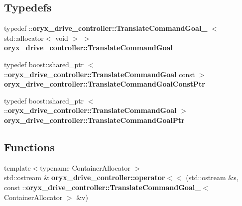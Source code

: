 \subsection*{\-Typedefs}
\begin{DoxyCompactItemize}
\item 
typedef \*
\-::{\bf oryx\-\_\-drive\-\_\-controller\-::\-Translate\-Command\-Goal\-\_\-}\*
$<$ std\-::allocator$<$ void $>$ $>$ {\bf oryx\-\_\-drive\-\_\-controller\-::\-Translate\-Command\-Goal}
\item 
typedef boost\-::shared\-\_\-ptr\*
$<$ \-::{\bf oryx\-\_\-drive\-\_\-controller\-::\-Translate\-Command\-Goal} \*
const  $>$ {\bf oryx\-\_\-drive\-\_\-controller\-::\-Translate\-Command\-Goal\-Const\-Ptr}
\item 
typedef boost\-::shared\-\_\-ptr\*
$<$ \-::{\bf oryx\-\_\-drive\-\_\-controller\-::\-Translate\-Command\-Goal} $>$ {\bf oryx\-\_\-drive\-\_\-controller\-::\-Translate\-Command\-Goal\-Ptr}
\end{DoxyCompactItemize}
\subsection*{\-Functions}
\begin{DoxyCompactItemize}
\item 
{\footnotesize template$<$typename Container\-Allocator $>$ }\\std\-::ostream \& {\bf oryx\-\_\-drive\-\_\-controller\-::operator$<$$<$} (std\-::ostream \&s, const \-::{\bf oryx\-\_\-drive\-\_\-controller\-::\-Translate\-Command\-Goal\-\_\-}$<$ \-Container\-Allocator $>$ \&v)
\end{DoxyCompactItemize}
